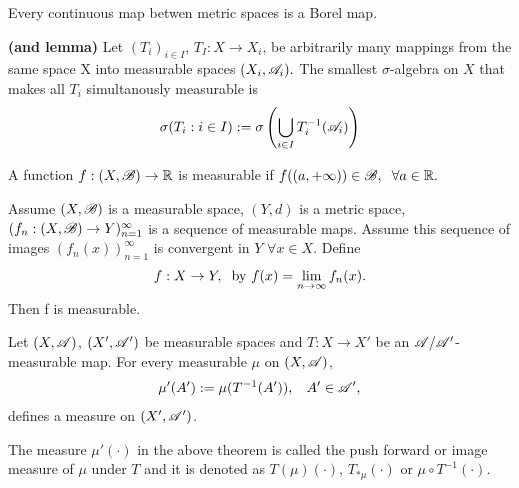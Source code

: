     \begin{corollary}
        Every continuous map betwen metric spaces is a Borel map.
    \end{corollary}

    \begin{definition}
        \textbf{(and lemma)}
        Let $(T_i)_{i\in I}$, $T_I:X\rightarrow X_i$, be arbitrarily many mappings from the same space X into measurable spaces $(X_i,\mathscr{A}_i).$ The smallest $\sigma$-algebra on $X$ that makes all $T_i$ simultanously measurable is 
        \begin{align}
            \sigma(T_i:i\in I) := \sigma \left( \bigcup_{i\in I}T_i^{-1}(\mathscr{A}_i)\right)
        \end{align}

    \end{definition}
	
    \begin{corollary}
        A function $f:(X,\mathscr{B})\rightarrow \mathbb R$ is measurable if $f((a,+\infty))\in \mathscr{B},\hspace{2mm}\forall a\in \mathbb R.$
    \end{corollary}

    \begin{corollary}
        Assume $(X,\mathscr{B})$ is a measurable space, $(Y,d)$ is a metric space, $(f_n:(X,\mathscr{B})\rightarrow Y)_{n=1}^\infty$ is a sequence of measurable maps.
        Assume this sequence of images $(f_n(x))_{n=1}^\infty$ is convergent in $Y$ $\forall x\in X$.
        Define \begin{align}
            f:X\rightarrow Y,\hspace{2mm}\text{by  } f(x)=\lim_{n\rightarrow \infty} f_n(x).
        \end{align}
        Then f is measurable.
    \end{corollary}

    \begin{theorem}
        Let $(X,\mathscr{A})$, $(X',\mathscr{A}')$ be measurable spaces and $T:X\rightarrow X'$ be an $\mathscr{A}/\mathscr{A}'$-measurable map. For every measurable $\mu$ on $(X,\mathscr{A})$, 
        \begin{align}
            \mu'(A') := \mu (T^{-1}(A')),\hspace{3mm} A'\in \mathscr{A}',
        \end{align}
        defines a measure on $(X',\mathscr{A}')$.
    \end{theorem}

    \begin{definition}
        The measure $\mu'(\cdot)$ in the above theorem is called the push forward or image measure of $\mu$ under $T$ and it is denoted as 
        $T(\mu)(\cdot)$, $T_{*\mu}(\cdot)$ or $\mu\circ T^{-1}(\cdot)$.
    \end{definition}

